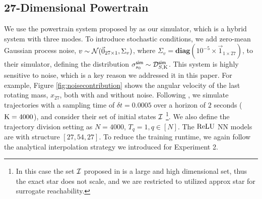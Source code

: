\subsection{27-Dimensional Powertrain }
\vspace{-2mm}
We use the powertrain system proposed by \cite{althoff2012avoiding} as our simulator, which is a hybrid system with three modes. To introduce stochastic conditions, we add zero-mean Gaussian process noise, $v \sim \mathcal{N}(\vec{0}_{27\times1}, \Sigma_v)$, where $\Sigma_v = \mathbf{diag}\left( 10^{-5}\times \vec{1}_{1\times27} \right)$, to their simulator, defining the distribution $\sigma^{\mathsf{sim}}_{s_0}\sim \mathcal{D}_{S,\mathrm{K}}^{\mathsf{sim}}$.
This system is highly sensitive to noise, which is a key reason we addressed it in this paper. For example, Figure \ref{fig:noisecontribution} shows the angular velocity of the last rotating mass, $x_{27}$, both with and without noise. Following \cite{althoff2012avoiding}, we simulate trajectories with a sampling time of $\delta t = 0.0005$ over a horizon of $2$ seconds ($\mathrm{K} = 4000$), and consider their set of initial states $\mathcal{I}$ \footnote{In this case the set $\mathcal{I}$ proposed in \cite{althoff2012avoiding} is a large and high dimensional set, thus the exact star does not scale, and we are restricted to utilized approx star for surrogate reachability.}. We also define the trajectory division setting as $N=4000$, $T_q=1, q\in[N]$. The $\mathrm{ReLU}$ NN models are with structure $[27, 54,27]$. To reduce the training runtime, we again follow the analytical interpolation strategy we introduced for Experiment 2.

